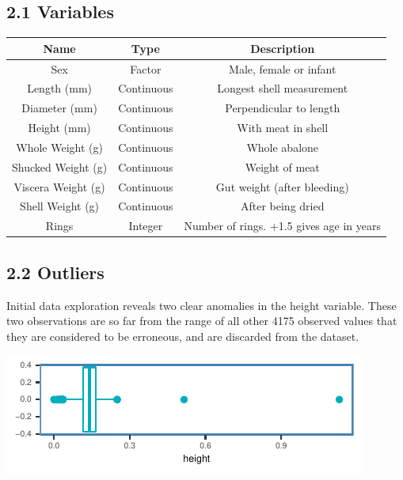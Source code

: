 \documentclass[letterpaper,9pt,twocolumn,twoside,]{pinp}
\begin{document}
\hypertarget{variables}{%
\subsection{2.1 Variables}\label{variables}}

\begin{center}
\begin{tabular}{|c|c|c|}
\hline
\textbf{Name} & \textbf{Type} & \textbf{Description} \\
\hline

Sex & Factor & Male, female or infant \\
\hline
Length (mm) & Continuous & Longest shell measurement \\
\hline
Diameter (mm) & Continuous & Perpendicular to length \\
\hline
Height (mm) & Continuous & With meat in shell \\
\hline
Whole Weight (g) & Continuous & Whole abalone \\
\hline
Shucked Weight (g) & Continuous & Weight of meat \\
\hline
Viscera Weight (g) & Continuous & Gut weight (after bleeding) \\
\hline
Shell Weight (g) & Continuous & After being dried \\
\hline
Rings & Integer & Number of rings. +1.5 gives age in years \\
\hline
\end{tabular}
\end{center}

\newpage

\hypertarget{outliers}{%
\subsection{2.2 Outliers}\label{outliers}}

Initial data exploration reveals two clear anomalies in the height
variable. These two observations are so far from the range of all other
4175 observed values that they are considered to be erroneous, and are
discarded from the dataset.

\begin{center}\includegraphics{ExecSum_files/figure-latex/unnamed-chunk-1-1} \end{center}
\end{document}
